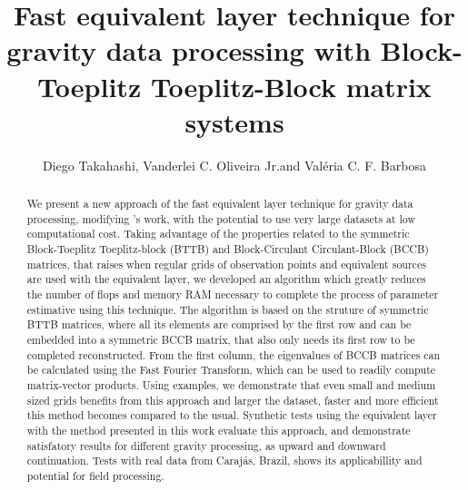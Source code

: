 \documentclass[paper]{geophysics}
\begin{document}
\title{Fast equivalent layer technique for gravity data processing with Block-Toeplitz Toeplitz-Block matrix systems}

\renewcommand{\thefootnote}{\fnsymbol{footnote}} 


\address{
\footnotemark[1]Observat\'orio Nacional, \\
77 General Jos\'e Cristino Av., \\
Rio de Janeiro, RJ, 20921400 \\
}
\author{Diego Takahashi\footnotemark[1], Vanderlei C. Oliveira Jr.\footnotemark[1] and Val\'eria
	C. F. Barbosa\footnotemark[1]}


\maketitle

\begin{abstract}
We present a new approach of the fast equivalent layer technique for gravity data processing, modifying \cite{siqueira2017fast}'s work, with the potential to use very large datasets at low computational cost. Taking advantage of the properties related to the symmetric Block-Toeplitz Toeplitz-block (BTTB) and Block-Circulant Circulant-Block (BCCB) matrices, that raises when regular grids of observation points and equivalent sources are used with the equivalent layer, we developed an algorithm which greatly reduces the number of flops and memory RAM necessary to complete the process of parameter estimative using this technique. The algorithm is based on the struture of symmetric BTTB matrices, where all its elements are comprised by the first row and can be embedded into a symmetric BCCB matrix, that also only needs its first row to be completed reconstructed. From the first column, the eigenvalues of BCCB matrices can be calculated using the Fast Fourier Transform, which can be used to readily compute matrix-vector products. Using examples, we demonstrate that even small and medium sized grids benefits from this approach and larger the dataset, faster and more efficient this method becomes compared to the usual. Synthetic tests using the equivalent layer with the method presented in this work evaluate this approach, and demonstrate satisfatory results for different gravity processing, as upward and downward continuation. Tests with real data from Caraj\'as, Brazil, shows its applicabillity and potential for field processing.
\end{abstract}
\end{document}
